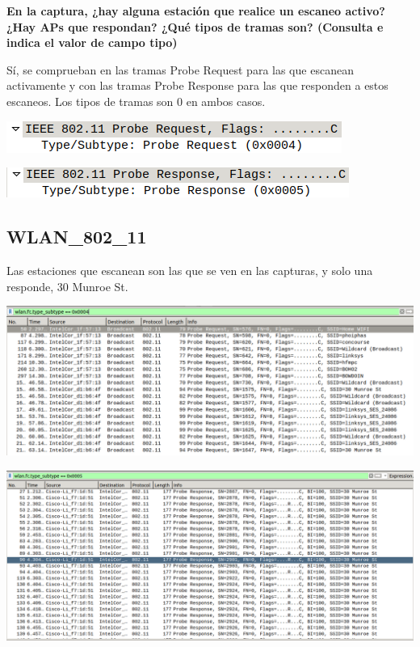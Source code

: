 \documentclass{article}
\begin{document}
\textbf{En la captura, ¿hay alguna estación que realice un escaneo activo? ¿Hay APs que
respondan? ¿Qué tipos de tramas son? (Consulta e indica el valor de campo tipo)}

Sí, se comprueban en las tramas Probe Request para las que escanean activamente y con las tramas Probe Response para las que responden a estos escaneos. Los tipos de tramas son 0 en ambos casos.

\begin{center}
\includegraphics[scale=0.4]{WLAN/req.png}
\end{center}
\begin{center}
\includegraphics[scale=0.4]{WLAN/res.png}
\end{center}

\subsection{WLAN\_802\_11}

Las estaciones que escanean son las que se ven en las capturas, y solo una responde, 30 Munroe St.

\begin{center}
\includegraphics[scale=0.3]{WLAN/probreq.png}
\end{center}
\begin{center}
\includegraphics[scale=0.3]{WLAN/probres.png}
\end{center}
\end{document}
